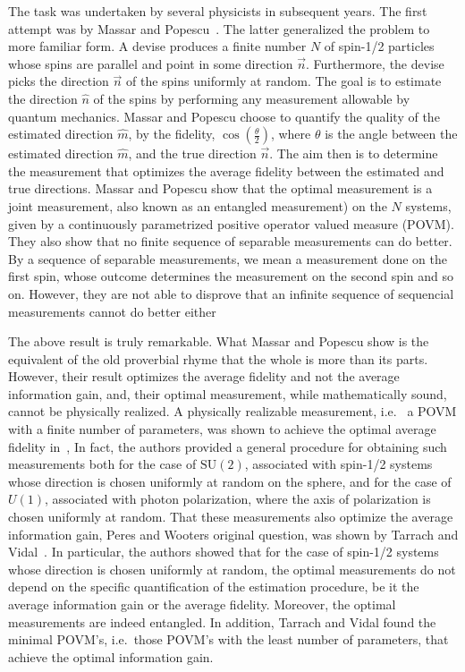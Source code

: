 \documentclass{article}
\begin{document}
The task was undertaken by several physicists in subsequent years.  The first attempt was by Massar and Popescu~\cite{MP95}.  The latter generalized the problem to more familiar form.  A devise produces a finite number $N$ of spin-1/2 particles whose spins are parallel and point in some direction $\vec{n}$. Furthermore, the devise picks the direction $\vec{n}$ of the spins uniformly at random.  The goal is to estimate the direction $\hat{n}$ of the spins by performing any measurement allowable by quantum mechanics.  Massar and Popescu choose to quantify the quality of the estimated direction $\hat{m}$, by the fidelity, $\cos\left(\frac{\theta}{2}\right)$, where $\theta$ is the angle between the estimated direction $\hat{m}$, and the true direction $\vec{n}$.  The aim then is to determine the measurement that optimizes the average fidelity between the estimated and true directions.  Massar and Popescu show that the optimal measurement is a joint measurement, also known as an entangled measurement) on the $N$ systems, given by a continuously parametrized positive operator valued measure (POVM).  They also show that no finite sequence of separable measurements can do better.  By a sequence of separable measurements, we mean a measurement done on the first spin, whose outcome determines the measurement on the second spin and so on.  However, they are not able to disprove that an infinite sequence of sequencial measurements cannot do better either

The above result is truly remarkable.  What Massar and Popescu show is the equivalent of the old proverbial rhyme that the whole is more than its parts.  However, their result optimizes the average fidelity and not the average information gain, and, their optimal measurement, while mathematically sound, cannot be physically realized.  A physically realizable measurement, i.e.~ a POVM with a finite number of parameters, was shown to achieve the optimal average fidelity in~\cite{DBE98},  In fact, the authors provided a general procedure for obtaining such measurements both for the case of $\mathrm{SU}(2)$, associated with spin-1/2 systems whose direction is chosen uniformly at random on the sphere, and for the case of $U(1)$, associated with photon polarization, where the axis of polarization is chosen uniformly at random.  That these measurements also optimize the average information gain, Peres and Wooters original question, was shown by Tarrach and Vidal~\cite{TV99}.  In particular, the authors showed that for the case of spin-1/2 systems whose direction is chosen uniformly at random, the optimal measurements do not depend on the specific quantification of the estimation procedure, be it the average information gain or the average fidelity.  Moreover, the optimal measurements are indeed entangled.  In addition, Tarrach and Vidal found the minimal POVM's, i.e.~those POVM's with the least number of parameters, that achieve the optimal information gain.  
\end{document}
